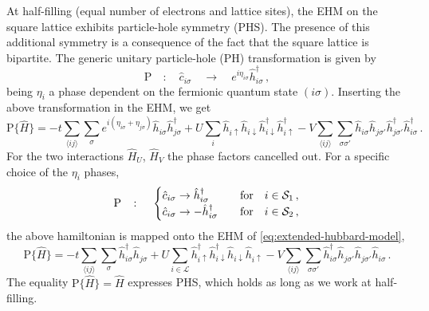 At half-filling (equal number of electrons and lattice sites), the EHM on the square lattice exhibits particle-hole symmetry (PHS). The presence of this additional symmetry is a consequence of the fact that the square lattice is bipartite. The generic unitary particle-hole (PH) transformation is given by
\begin{equation}\label{eq:phs-P-general}
	\mathrm{P}
	\quad\colon\quad
	\hat c_{i\sigma}
	\quad\to\quad
	e^{i\eta_{i\sigma}} \hat h_{i\sigma}^\dagger \, ,
\end{equation}
being $\eta_i$ a phase dependent on the fermionic quantum state $(i\sigma)$. Inserting the above transformation in the EHM, we get
\[
	\mathrm{P} \lbrace \hat H \rbrace =
	-t \sum_{\langle ij \rangle} \sum_\sigma e^{i(\eta_{i\sigma} + \eta_{j\sigma})} \hat h_{i\sigma} \hat h_{j\sigma}^\dagger
	+U \sum_i \hat h_{i\uparrow} \hat h_{i\downarrow} \hat h_{i\downarrow}^\dagger \hat h_{i\uparrow}^\dagger
	- V \sum_{\langle ij \rangle} \sum_{\sigma \sigma'} \hat h_{i\sigma} \hat h_{j\sigma'} \hat h_{j\sigma'}^\dagger \hat h_{i\sigma}^\dagger \, .
\]
For the two interactions $\hat H_U$, $\hat H_V$ the phase factors cancelled out. For a specific choice of the $\eta_i$ phases, 
\begin{equation}\label{eq:phs}
	\mathrm{P}
	\quad\colon\quad
	\begin{cases}
		\hat c_{i\sigma} \to \hat h_{i\sigma}^\dagger
		&\qq{for}
		i \in \mathcal{S}_1 \, , \\
		\hat c_{i\sigma} \to -\hat h_{i\sigma}^\dagger
		&\qq{for}
		i \in \mathcal{S}_2 \, ,
	\end{cases}
\end{equation}
the above hamiltonian is mapped onto the EHM of \eqref{eq:extended-hubbard-model},
\[
	\mathrm{P} \lbrace \hat H \rbrace =
	-t \sum_{\langle ij \rangle} \sum_\sigma \hat h_{i\sigma}^\dagger \hat h_{j\sigma}
	+U \sum_{i\in\mathcal{L}} \hat h_{i\uparrow}^\dagger \hat h_{i\downarrow}^\dagger \hat h_{i\downarrow} \hat h_{i\uparrow}
	- V \sum_{\langle ij \rangle} \sum_{\sigma \sigma'} \hat h_{i\sigma}^\dagger \hat h_{j\sigma'} \hat h_{j\sigma'} \hat h_{i\sigma} \, .
\]
The equality $\mathrm{P} \lbrace \hat H \rbrace = \hat H$ expresses PHS, which holds as long as we work at half-filling.

